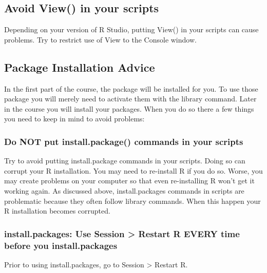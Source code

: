 \documentclass[
]{krantz}
\begin{document}
\hypertarget{avoid-view-in-your-scripts}{%
\subsection{Avoid View() in your scripts}\label{avoid-view-in-your-scripts}}

Depending on your version of R Studio, putting View() in your scripts can cause problems. Try to restrict use of View to the Console window.

\hypertarget{package-installation-advice}{%
\subsection{Package Installation Advice}\label{package-installation-advice}}

In the first part of the course, the package will be installed for you. To use those package you will merely need to activate them with the library command. Later in the course you will install your packages. When you do so there a few things you need to keep in mind to avoid problems:

\hypertarget{do-not-put-install.package-commands-in-your-scripts}{%
\subsubsection{Do NOT put install.package() commands in your scripts}\label{do-not-put-install.package-commands-in-your-scripts}}

Try to avoid putting install.package commands in your scripts. Doing so can corrupt your R installation. You may need to re-install R if you do so. Worse, you may create problems on your computer so that even re-installing R won't get it working again. As discussed above, install.packages commands in scripts are problematic because they often follow library commands. When this happen your R installation becomes corrupted.

\hypertarget{install.packages-use-session-restart-r-every-time-before-you-install.packages}{%
\subsubsection{install.packages: Use Session \textgreater{} Restart R EVERY time before you install.packages}\label{install.packages-use-session-restart-r-every-time-before-you-install.packages}}

Prior to using install.packages, go to Session \textgreater{} Restart R.
\end{document}
